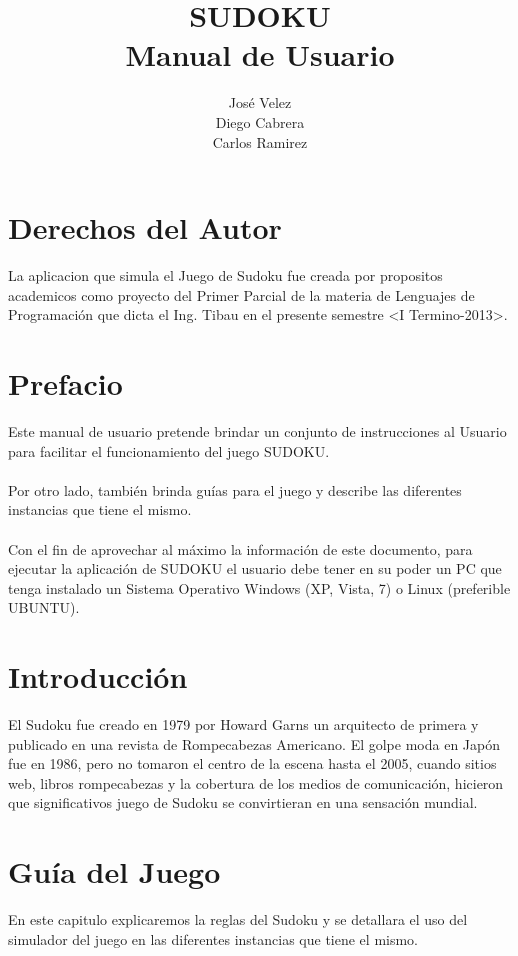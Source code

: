 \documentclass[12pt,oneside]{book}
\title{SUDOKU \\ Manual de Usuario}
\author{José Velez \\ Diego Cabrera \\ Carlos Ramirez}
\begin{document}
\maketitle
\tableofcontents


\chapter{Derechos del Autor}
La aplicacion que simula el Juego de Sudoku fue creada por propositos academicos como proyecto del Primer Parcial de la materia de Lenguajes de Programación que dicta el Ing. Tibau en el presente semestre <I Termino-2013>.


\chapter{Prefacio}

Este manual de usuario pretende brindar un conjunto de instrucciones al Usuario para facilitar el funcionamiento del juego SUDOKU. \ \\ \\ 
Por otro lado, también brinda guías para el juego y describe las diferentes instancias que tiene el mismo. \ \\ \\
Con el fin de aprovechar al máximo la información de este documento, para ejecutar la aplicación de SUDOKU el usuario debe tener en su poder un PC que tenga instalado un Sistema Operativo Windows (XP, Vista, 7) o Linux (preferible UBUNTU).


\chapter{Introducción}

El Sudoku  fue creado en 1979 por Howard Garns un arquitecto de primera y publicado en una revista de Rompecabezas Americano. El golpe moda en Japón fue en 1986, pero no tomaron el centro de la escena hasta el 2005, cuando sitios web, libros rompecabezas y la cobertura de los medios de comunicación, hicieron que  significativos juego de Sudoku se convirtieran en una sensación mundial.



\chapter{Guía del Juego}

En este capitulo explicaremos la reglas del Sudoku y se detallara el uso del simulador del juego en las diferentes instancias que tiene el mismo. 
\end{document}
